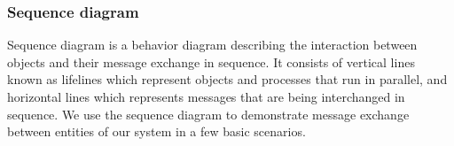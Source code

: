 \subsubsection{Sequence diagram}
Sequence diagram is a behavior diagram describing the interaction between objects and their message exchange in sequence. It consists of vertical lines known as lifelines which represent objects and processes that run in parallel, and horizontal lines which represents messages that are being interchanged in sequence. We use the sequence diagram to demonstrate message exchange between entities of our system in a few basic scenarios.